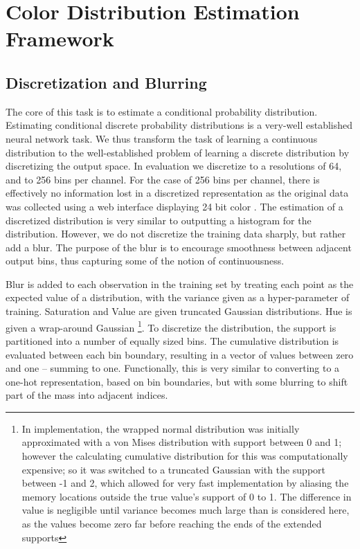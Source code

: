 \documentclass[11pt,letterpaper]{article}
\newcommand{\parencite}{\cite}
\begin{document}
\section{Color Distribution Estimation Framework}\label{sec:method}

\subsection{Discretization and Blurring}
The core of this task is to estimate a conditional probability distribution.
Estimating conditional discrete probability distributions is a very-well established neural network task.
We thus transform the task of learning a continuous distribution to the well-established problem of learning a discrete distribution by discretizing the output space.
In evaluation we discretize to a resolutions of 64, and to 256 bins per channel.
For the case of 256 bins per channel, there is effectively no information lost in a discretized representation as the original data was collected using a web interface displaying 24 bit color \parencite{Monroe2010XKCDdataset}.
The estimation of a discretized distribution is very similar to outputting a histogram for the distribution.
However, we do not discretize the training data sharply, but rather add a blur.
The purpose of the blur is to encourage smoothness between adjacent output bins, thus capturing some of the notion of continuousness.

Blur is added to each observation in the training set by treating each point as the expected value of a distribution, with the variance given as a hyper-parameter of training.
Saturation and Value are given truncated Gaussian distributions.
Hue is given a wrap-around Gaussian \footnote{In implementation, the wrapped normal distribution was initially approximated with a von Mises distribution with support between 0 and 1; however the calculating cumulative distribution for this was computationally expensive; so it was switched to a truncated Gaussian with the support between -1 and 2, which allowed for very fast implementation by aliasing the memory locations outside the true value's support of 0 to 1. The difference in value is negligible until variance becomes much large than is considered here, as the values become zero far before reaching the ends of the extended supports}.
To discretize the distribution, the support is partitioned into a number of equally sized bins.
The cumulative distribution is evaluated between each bin boundary, resulting in a vector of values between zero and one -- summing to one.
Functionally, this is very similar to converting to a one-hot representation, based on bin boundaries, but with some blurring to shift part of the mass into adjacent indices.
\end{document}
